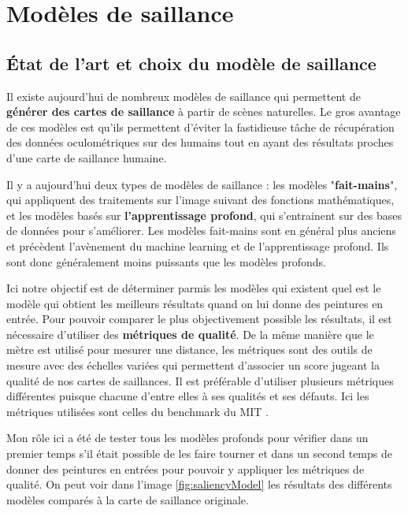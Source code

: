 \chapter{Modèles de saillance}

\section{État de l'art et choix du modèle de saillance}

\par
Il existe aujourd'hui de nombreux modèles de saillance qui permettent de \textbf{générer des cartes de saillance} à partir de scènes naturelles. Le gros avantage de ces modèles est qu'ils permettent d'éviter la fastidieuse tâche de récupération des données oculométriques sur des humains tout en ayant des résultats proches d'une carte de saillance humaine.

\par
Il y a aujourd'hui deux types de modèles de saillance : les modèles "\textbf{fait-mains}", qui appliquent des traitements sur l'image suivant des fonctions mathématiques, et les modèles basés sur \textbf{l'apprentissage profond}, qui s'entrainent sur des bases de données pour s'améliorer. Les modèles fait-mains sont en général plus anciens et précèdent l'avènement du machine learning et de l'apprentissage profond. Ils sont donc généralement moins puissants que les modèles profonds.

\par
Ici notre objectif est de déterminer parmis les modèles qui existent quel est le modèle qui obtient les meilleurs résultats quand on lui donne des peintures en entrée. Pour pouvoir comparer le plus objectivement possible les résultats, il est nécessaire d'utiliser des \textbf{métriques de qualité}. De la même manière que le mètre est utilisé pour mesurer une distance, les métriques sont des outils de mesure avec des échelles variées qui permettent d'associer un score jugeant la qualité de nos cartes de saillances. Il est préférable d'utiliser plusieurs métriques différentes puisque chacune d'entre elles à ses qualités et ses défauts. Ici les métriques utilisées sont celles du benchmark du MIT \cite{benchmark_MIT}.

\par
Mon rôle ici a été de tester tous les modèles profonds pour vérifier dans un premier temps s'il était possible de les faire tourner et dans un second temps de donner des peintures en entrées pour pouvoir y appliquer les métriques de qualité. On peut voir dans l'image \ref{fig:saliencyModel} les résultats des différents modèles comparés à la carte de saillance originale. 

